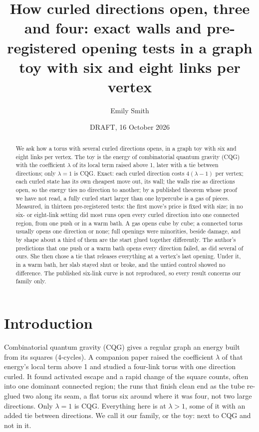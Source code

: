 \documentclass[aps,pre,10pt,twocolumn,superscriptaddress,nofootinbib]{revtex4-2}
\begin{document}
\title{How curled directions open, three and four: exact walls and pre-registered opening tests in a graph toy
with six and eight links per vertex}

\author{Emily Smith}

\date{DRAFT, 16 October 2026}

\begin{abstract}
We ask how a torus with several curled directions opens, in a graph toy with six and eight links per vertex. The toy
is the energy of combinatorial quantum gravity (CQG) with the coefficient $\lambda$ of its local term raised above
1, later with a tie between directions; only $\lambda = 1$ is CQG. Exact: each curled direction costs
$4(\lambda - 1)$ per vertex; each curled state has its own cheapest move out, its wall; the walls rise as directions
open, so the energy ties no direction to another; by a published theorem whose proof we have not read, a fully
curled start larger than one hypercube is a gas of pieces. Measured, in thirteen pre-registered tests: the first
move's price is fixed with size; in no six- or eight-link setting did most runs open every curled direction into one
connected region, from one push or in a warm bath. A gas opens cube by cube; a connected torus usually opens one
direction or none; full openings were minorities, beside damage, and by shape about a third of them are the start
glued together differently. The author's predictions that one push or a warm bath opens every direction failed, as
did several of ours. She then chose a tie that releases everything at a vertex's last opening. Under it, in a warm
bath, her slab stayed shut or broke, and the untied control showed no difference. The published six-link curve is
not reproduced, so every result concerns our family only.
\end{abstract}

\maketitle

\section{Introduction}

Combinatorial quantum gravity (CQG) \cite{KTB19,T25} gives a regular graph an energy built from its squares
(4-cycles). A companion paper \cite{paper1} raised the coefficient $\lambda$ of that energy's local term above 1 and
studied a four-link torus with one direction curled. It found activated escape and a rapid change of the square
counts, often into one dominant connected region; the runs that finish clean end as the tube re-glued two along its
seam, a flat torus six around where it was four, not two large directions. Only $\lambda = 1$ is CQG. Everything here is at $\lambda > 1$, some of
it with an added tie between directions. We call it our family, or the toy: next to CQG and not in it.
\end{document}
